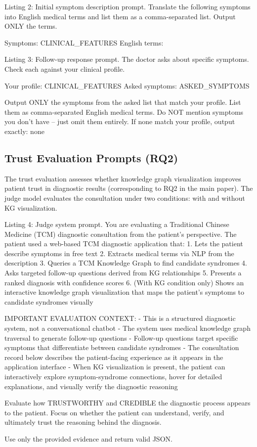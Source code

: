 \documentclass[12pt]{article}
\begin{document}
\begin{promptbox}{Listing 2: Initial symptom description prompt.}
Translate the following symptoms into English medical terms and
list them as a comma-separated list. Output ONLY the terms.

Symptoms: {CLINICAL_FEATURES}
English terms:
\end{promptbox}

\begin{promptbox}{Listing 3: Follow-up response prompt.}
The doctor asks about specific symptoms. Check each against your
clinical profile.

Your profile: {CLINICAL_FEATURES}
Asked symptoms: {ASKED_SYMPTOMS}

Output ONLY the symptoms from the asked list that match your
profile. List them as comma-separated English medical terms. Do NOT
mention symptoms you don't have -- just omit them entirely. If none
match your profile, output exactly: none
\end{promptbox}

\subsection{Trust Evaluation Prompts (RQ2)}
The trust evaluation assesses whether knowledge graph visualization improves patient trust in diagnostic results (corresponding to RQ2 in the main paper). The judge model evaluates the consultation under two conditions: with and without KG visualization.

\begin{promptbox}{Listing 4: Judge system prompt.}
You are evaluating a Traditional Chinese Medicine (TCM) diagnostic
consultation from the patient's perspective. The patient used a
web-based TCM diagnostic application that:
1. Lets the patient describe symptoms in free text
2. Extracts medical terms via NLP from the description
3. Queries a TCM Knowledge Graph to find candidate syndromes
4. Asks targeted follow-up questions derived from KG relationships
5. Presents a ranked diagnosis with confidence scores
6. (With KG condition only) Shows an interactive knowledge graph
   visualization that maps the patient's symptoms to candidate
   syndromes visually

IMPORTANT EVALUATION CONTEXT:
- This is a structured diagnostic system, not a conversational
  chatbot
- The system uses medical knowledge graph traversal to generate
  follow-up questions
- Follow-up questions target specific symptoms that differentiate
  between candidate syndromes
- The consultation record below describes the patient-facing
  experience as it appears in the application interface
- When KG visualization is present, the patient can interactively
  explore symptom-syndrome connections, hover for detailed
  explanations, and visually verify the diagnostic reasoning

Evaluate how TRUSTWORTHY and CREDIBLE the diagnostic process
appears to the patient. Focus on whether the patient can
understand, verify, and ultimately trust the reasoning behind
the diagnosis.

Use only the provided evidence and return valid JSON.
\end{promptbox}
\end{document}
